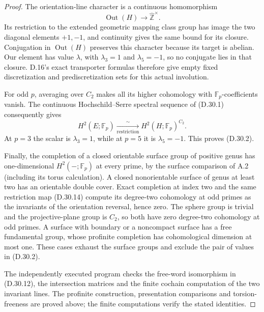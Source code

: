 \begin{proof}
The orientation-line character is a continuous homomorphism
\[
 \operatorname{Out}(H)\longrightarrow
                    \widehat{\mathbb Z}^{\times}.
\]
Its restriction to the extended geometric mapping class group
has image the two diagonal elements $+1,-1$, and continuity gives
the same bound for its closure. Conjugation in $\operatorname{Out}(H)$
preserves this character because its target is abelian. Our element
has value $\lambda$, with $\lambda_3=1$ and $\lambda_5=-1$, so no
conjugate lies in that closure. D.16's exact transporter formulas
therefore give empty fixed discretization and prediscretization
sets for this actual involution.

For odd $p$, averaging over $C_2$ makes all its higher cohomology
with $\mathbb F_p$-coefficients vanish.  The continuous
Hochschild--Serre spectral sequence of (D.30.1) consequently gives
\[
 H^2(E;\mathbb F_p)\xrightarrow[\mathrm{restriction}]{\sim}
                      H^2(H;\mathbb F_p)^{C_2}.
                                                        \tag{D.30.14}
\]
At $p=3$ the scalar is $\lambda_3=1$, while at $p=5$ it is
$\lambda_5=-1$.  This proves (D.30.2).

Finally, the completion of a closed orientable surface group of
positive genus has one-dimensional $H^2(-;\mathbb F_p)$ at every
prime, by the surface comparison of A.2 (including its torus
calculation).  A closed nonorientable surface of genus at least
two has an orientable double cover.  Exact completion at index
two and the same restriction map (D.30.14) compute its degree-two
cohomology at odd primes as the invariants of the orientation
reversal, hence zero.  The sphere group is trivial and the
projective-plane group is $C_2$, so both have zero degree-two
cohomology at odd primes.  A surface with boundary or a noncompact
surface has a free fundamental group, whose profinite completion
has cohomological dimension at most one.  These cases exhaust the
surface groups and exclude the pair of values in (D.30.2).

The independently executed program
checks the free-word isomorphism in (D.30.12), the intersection
matrices and the finite cochain computation of the two invariant
lines.  The profinite construction, presentation comparisons and
torsion-freeness are proved above; the finite computations verify
the stated identities.
\end{proof}
